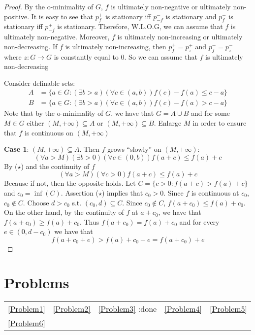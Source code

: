 \documentclass[11pt]{article}
\begin{document}
\begin{proof}
By the o-minimality of \(G\), \(f\) is ultimately non-negative or ultimately non-positive. It is
easy to see that \(p_f^+\) is stationary iff \(p_{-f}^-\) is stationary and \(p_f^-\) is stationary
iff \(p_{-f}^+\) is stationary. Therefore, W.L.O.G, we can assume that \(f\) is ultimately
non-negative. Moreover, \(f\) is ultimately non-increasing or ultimately non-decreasing.
If \(f\) is ultimately non-increasing, then \(p_f^+=p_z^+\) and \(p_f^-=p_z^-\) where \(z:G\to G\) is
constantly equal to 0\label{Problem6}. So we can assume that \(f\) is ultimately non-decreasing

Consider definable sets:
\begin{align*}
A&=\{a\in G:(\exists b>a)(\forall c\in(a,b))f(c)-f(a)\le c-a\}\\
B&=\{a\in G:(\exists b>a)(\forall c\in(a,b))f(c)-f(a)>c-a\}
\end{align*}
Note that by the o-minimality of \(G\), we have that \(G=A\cup B\) and for some \(M\in G\)
either \((M,+\infty)\subseteq A\) or \((M,+\infty)\subseteq B\). Enlarge \(M\) in order to ensure that \(f\) is continuous
on \((M,+\infty)\)

\textbf{Case 1}: \((M,+\infty)\subseteq A\). Then \(f\) grows ``slowly'' on \((M,+\infty)\):
\begin{equation*}
(\forall a>M)(\exists b>0)(\forall c\in(0,b))f(a+c)\le f(a)+c\tag{\star}
\end{equation*}
By (\(\star\)) and the continuity of \(f\)
\begin{equation*}
(\forall a>M)(\forall c>0)f(a+c)\le f(a)+c\tag{\star\star}
\end{equation*}
Because if not, then the opposite holds. Let \(C=\{c>0:f(a+c)>f(a)+c\}\) and \(c_0=\inf(C)\).
Assertion (\(\star\)) implies that \(c_0>0\). Since \(f\) is continuous at \(c_0\), \(c_0\notin C\).
Choose \(d>c_0\) s.t. \((c_0,d)\subseteq C\). Since \(c_0\notin C\), \(f(a+c_0)\le f(a)+c_0\). On the other
hand, by the continuity of \(f\) at \(a+c_0\), we have that \(f(a+c_0)\ge f(a)+c_0\).
Thus \(f(a+c_0)=f(a)+c_0\) and for every \(e\in(0,d-c_0)\) we have that
\begin{equation*}
f(a+c_0+e)>f(a)+c_0+e=f(a+c_0)+e
\end{equation*}
\end{proof}

\section{Problems}
\label{sec:orgdfe0dd0}
\begin{center}
\begin{tabular}{lllll}
\ref{Problem1} & \ref{Problem2} & \ref{Problem3} :done & \ref{Problem4} & \ref{Problem5}\\
\ref{Problem6} &  & \\
\end{tabular}
\end{center}
\end{document}
